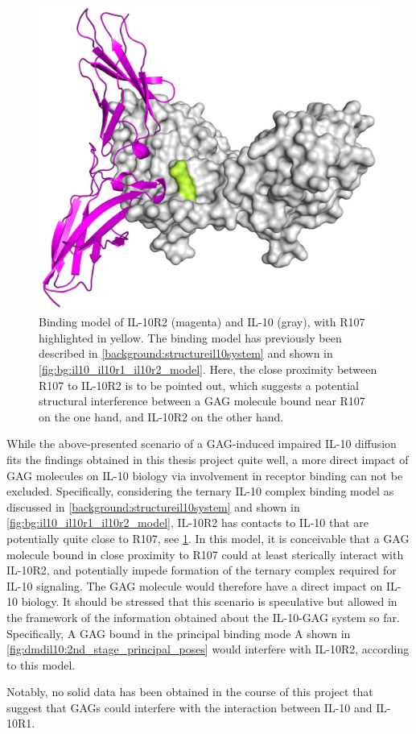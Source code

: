\begin{figure}
\centering
\includegraphics[width=1.0\textwidth]{gfx/together/il10dimer_surface_r2cartoon_r107_01.jpg}
\caption[]{
Binding model of IL-10R2 (magenta) and IL-10 (gray), with R107 highlighted in
yellow. The binding model has previously been described in
\cref{background:structureil10system} and shown in
\cref{fig:bg:il10_il10r1_il10r2_model}. Here, the close proximity between R107
to IL-10R2 is to be pointed out, which suggests a potential structural
interference between a GAG molecule bound near R107 on the one hand, and IL-10R2
on the other hand.}
\label{fig:together:r2impaired}
\end{figure}

While the above-presented scenario of a GAG-induced impaired IL-10 diffusion
fits the findings obtained in this thesis project quite well, a more direct
impact of GAG molecules on IL-10 biology via involvement in receptor binding
can not be excluded. Specifically, considering the ternary IL-10 complex
binding model as discussed in \cref{background:structureil10system} and shown in
\cref{fig:bg:il10_il10r1_il10r2_model}, IL-10R2 has contacts to IL-10 that
are potentially quite close to R107, see \cref{fig:together:r2impaired}. In this
model, it is conceivable that a GAG molecule bound in close proximity to R107
could at least sterically interact with IL-10R2, and potentially impede
formation of the ternary complex required for IL-10 signaling. The GAG molecule
would therefore have a direct impact on IL-10 biology. It should be stressed
that this scenario is speculative but allowed in the framework of the
information obtained about the IL-10-GAG system so far. Specifically, A GAG
bound in the principal binding mode A shown in
\cref{fig:dmdil10:2nd_stage_principal_poses} would interfere with IL-10R2,
according to this model.

Notably, no solid data has been obtained in the course of this project that
suggest that GAGs could interfere with the interaction between IL-10 and
IL-10R1.
